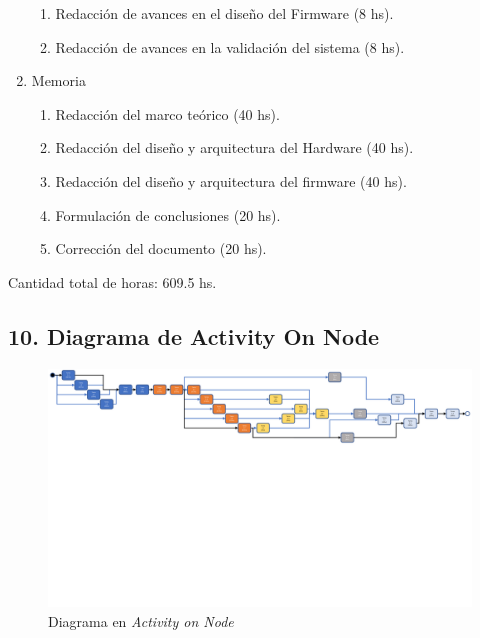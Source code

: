 \documentclass[
11pt, %
codirector, %
]{charter}
\begin{document}
\begin{enumerate}
\begin{enumerate}
		      \item Redacción de avances en el diseño del Firmware (8 hs).
		      \item Redacción de avances en la validación del sistema (8 hs).
	      \end{enumerate}
	\item Memoria
	      \begin{enumerate}
		      \item Redacción del marco teórico (40 hs).
		      \item Redacción del diseño y arquitectura del Hardware (40 hs).
		      \item Redacción del diseño y arquitectura del firmware (40 hs).
		      \item Formulación de conclusiones (20 hs).
		      \item Corrección del documento (20 hs).
	      \end{enumerate}
\end{enumerate}

Cantidad total de horas: 609.5 hs.
\begin{landscape}
	\section{10. Diagrama de Activity On Node}
	\label{sec:AoN}

	\begin{figure}[htpb]
		\centering
		\includegraphics[width=1.5\textwidth]{./Figuras/Aon_cropped.pdf}
		\caption{Diagrama en \textit{Activity on Node}}
		\label{fig:AoN}
	\end{figure}
\end{landscape}
\end{document}
